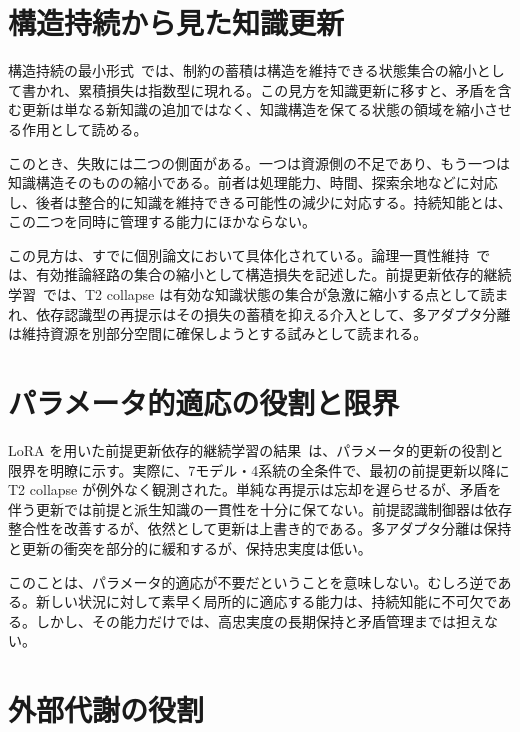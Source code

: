 \documentclass[12pt,a4paper]{article}
\begin{document}
\section{構造持続から見た知識更新}

構造持続の最小形式~\cite{paper1}では、制約の蓄積は構造を維持できる状態集合の縮小として書かれ、累積損失は指数型に現れる。この見方を知識更新に移すと、矛盾を含む更新は単なる新知識の追加ではなく、知識構造を保てる状態の領域を縮小させる作用として読める。

このとき、失敗には二つの側面がある。一つは資源側の不足であり、もう一つは知識構造そのものの縮小である。前者は処理能力、時間、探索余地などに対応し、後者は整合的に知識を維持できる可能性の減少に対応する。持続知能とは、この二つを同時に管理する能力にほかならない。

この見方は、すでに個別論文において具体化されている。論理一貫性維持~\cite{paper3}では、有効推論経路の集合の縮小として構造損失を記述した。前提更新依存的継続学習~\cite{paper4}では、T2 collapse は有効な知識状態の集合が急激に縮小する点として読まれ、依存認識型の再提示はその損失の蓄積を抑える介入として、多アダプタ分離は維持資源を別部分空間に確保しようとする試みとして読まれる。

\section{パラメータ的適応の役割と限界}

LoRA を用いた前提更新依存的継続学習の結果~\cite{paper4}は、パラメータ的更新の役割と限界を明瞭に示す。実際に、7モデル・4系統の全条件で、最初の前提更新以降に T2 collapse が例外なく観測された。単純な再提示は忘却を遅らせるが、矛盾を伴う更新では前提と派生知識の一貫性を十分に保てない。前提認識制御器は依存整合性を改善するが、依然として更新は上書き的である。多アダプタ分離は保持と更新の衝突を部分的に緩和するが、保持忠実度は低い。

このことは、パラメータ的適応が不要だということを意味しない。むしろ逆である。新しい状況に対して素早く局所的に適応する能力は、持続知能に不可欠である。しかし、その能力だけでは、高忠実度の長期保持と矛盾管理までは担えない。

\section{外部代謝の役割}
\end{document}
